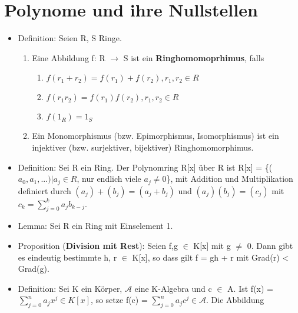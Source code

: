 \section{Polynome und ihre Nullstellen}
\begin{itemize}
\item Definition: Seien R, S Ringe.
\begin{enumerate}
\item Eine Abbildung f: R $\to$ S ist ein \textbf{Ringhomomoprhimus}, falls
\begin{enumerate}
\item $f(r_1 +r_2) = f(r_1) + f(r_2), r_1,r_2 \in R$
\item $f(r_1r_2) = f(r_1)f(r_2), r_1,r_2 \in R$
\item $f(1_R) = 1_S$
\end{enumerate}
\item Ein Monomorphismus (bzw. Epimorphismus, Isomorphismus) ist ein injektiver (bzw. surjektiver, bijektiver) Ringhomomorphimus.
\end{enumerate}
\item Definition: Sei R ein Ring. Der Polynomring R[x] über R ist R[x] = \{($a_0,a_1,...) | a_j \in R$, nur endlich viele $a_j \neq 0$\},
mit Addition und Multiplikation definiert durch $(a_j) + (b_j) = (a_j + b_j)$ und $(a_j)(b_j) = (c_j)$ mit $c_k = \sum\nolimits_{j=0}^{k} a_j b_{k-j}$.
\item Lemma: Sei R ein Ring mit Einselement 1.
\item Proposition (\textbf{Division mit Rest}): Seien f,g $\in$ K[x] mit g $\neq$ 0. Dann gibt es eindeutig bestimmte h, r $\in$ K[x], so dass gilt f = gh + r mit Grad(r) < Grad(g).
\item Definition: Sei K ein Körper, $\mathcal{A}$ eine K-Algebra und c $\in$ A. Ist f(x) = $\sum\nolimits_{j=0}^{n} a_j x^j \in K[x]$, so setze f(c) = $\sum\nolimits_{j=0}^{n} a_j c^j \in \mathcal{A}$. Die Abbildung
\begin{center}

\end{center}
\end{itemize}
